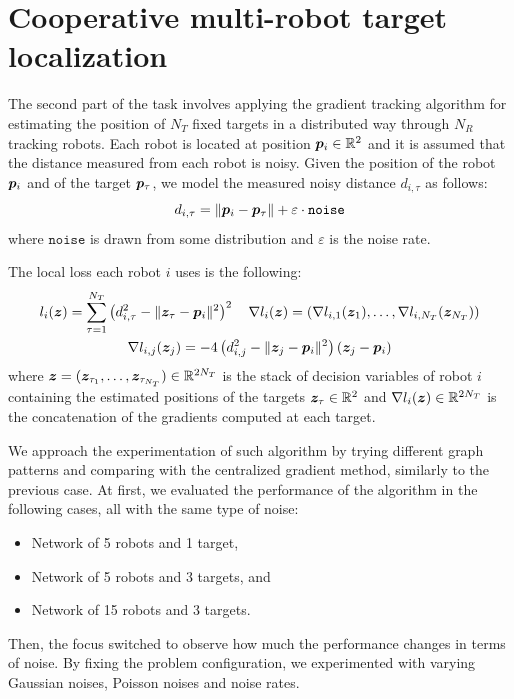 \documentclass[a4paper,11pt,oneside]{book}
\begin{document}
\section{Cooperative multi-robot target localization}

The second part of the task involves applying the gradient tracking algorithm for estimating the position of $N_T$ fixed targets in a distributed way through $N_R$ tracking robots. Each robot is located at position ${\bm{p}}_i \in {\mathbb{R}}^2$ and it is assumed that the distance measured from each robot is noisy. Given the position of the robot ${\bm{p}}_i$ and of the target ${\bm{p}}_\tau$, we model the measured noisy distance $d_{i,\tau}$ as follows:
\[
      d_{i,\tau} = \Vert {\bm{p}}_i - {\bm{p}}_\tau \Vert + \varepsilon \cdot \texttt{noise}
\]
where $\texttt{noise}$ is drawn from some distribution and $\varepsilon$ is the noise rate.

The local loss each robot $i$ uses is the following:
\[
      \begin{gathered}
            l_i({\bm{z}}) = \sum_{\tau=1}^{N_T} \left( d_{i,\tau}^2 - \Vert {\bm{z}}_{\tau} - {\bm{p}}_i \Vert^2 \right)^2
            \quad
            \nabla l_{i}({\bm{z}}) = (\nabla l_{i,1}({\bm{z}}_{1}), \dots, \nabla l_{i,N_T}({\bm{z}}_{N_T}))
            \\
            \nabla l_{i,j}({\bm{z}}_{j}) = -4 \left( d_{i,j}^2 - \Vert {\bm{z}}_{j} - {\bm{p}}_i \Vert^2 \right) \left( {\bm{z}}_{j} - {\bm{p}}_i \right)
      \end{gathered}
\]
where ${\bm{z}} = ({\bm{z}}_{\tau_1}, \dots, {\bm{z}}_{\tau_{N_T}}) \in {\mathbb{R}}^{2N_T}$ is the stack of decision variables of robot $i$ containing the estimated positions of the targets ${\bm{z}}_{\tau} \in {\mathbb{R}}^2$ and $\nabla l_i({\bm{z}}) \in {\mathbb{R}}^{2N_T}$ is the concatenation of the gradients computed at each target.

We approach the experimentation of such algorithm by trying different graph patterns and comparing with the centralized gradient method, similarly to the previous case. At first, we evaluated the performance of the algorithm in the following cases, all with the same type of noise:
\begin{itemize}
      \item Network of 5 robots and 1 target,
      \item Network of 5 robots and 3 targets, and
      \item Network of 15 robots and 3 targets.
\end{itemize}

Then, the focus switched to observe how much the performance changes in terms of noise. By fixing the problem configuration, we experimented with varying Gaussian noises, Poisson noises and noise rates.
\end{document}
